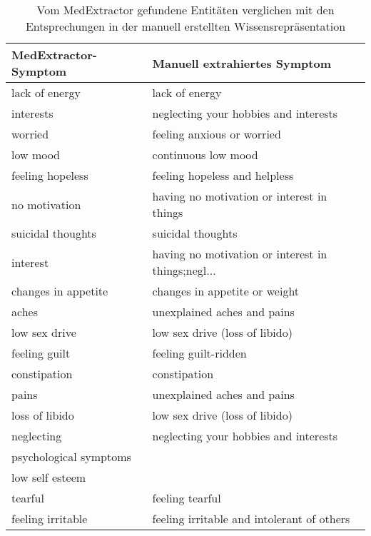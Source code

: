 \begin{table}
\begin{center}
\begin{tabular}{ll}
\toprule
  MedExtractor-Symptom &                       Manuell extrahiertes Symptom \\
\midrule
        lack of energy &                                     lack of energy \\
             interests &              neglecting your hobbies and interests \\
               worried &                         feeling anxious or worried \\
              low mood &                                continuous low mood \\
      feeling hopeless &                      feeling hopeless and helpless \\
         no motivation &         having no motivation or interest in things \\
     suicidal thoughts &                                  suicidal thoughts \\
              interest & having no motivation or interest in things;negl... \\
   changes in appetite &                      changes in appetite or weight \\
                 aches &                        unexplained aches and pains \\
         low sex drive &                     low sex drive (loss of libido) \\
         feeling guilt &                               feeling guilt-ridden \\
          constipation &                                       constipation \\
                 pains &                        unexplained aches and pains \\
        loss of libido &                     low sex drive (loss of libido) \\
            neglecting &              neglecting your hobbies and interests \\
psychological symptoms &                                                    \\
       low self esteem &                                                    \\
               tearful &                                    feeling tearful \\
     feeling irritable &         feeling irritable and intolerant of others \\
\bottomrule
\end{tabular}
\caption{Vom MedExtractor gefundene Entitäten verglichen mit den Entsprechungen in der manuell erstellten Wissensrepräsentation}
\label{tab:vergleich_medextractor_manuell}
\end{center}
\end{table}


